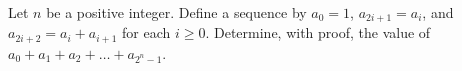 Let $n$ be a positive integer. Define a sequence by $a_0 = 1$,  $a_{2i+1} = a_i$,  and $a_{2i+2} = a_i + a_{i+1}$ for each $i \ge 0$. Determine, with proof, the value of $a_0 + a_1 + a_2 + \dots + a_{2^n-1}$.